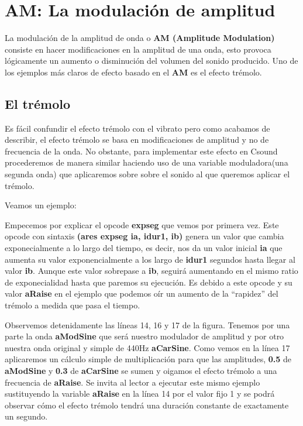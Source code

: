 \section{AM: La modulación de amplitud}

La modulación de la amplitud de onda o \textbf{AM (Amplitude Modulation)} consiste en hacer modificaciones en la amplitud de una onda, esto provoca lógicamente un aumento o disminución del volumen del sonido producido. Uno de los ejemplos más claros de efecto basado en el \textbf{AM} es el efecto trémolo.

\subsection{El trémolo}

Es fácil confundir el efecto trémolo con el vibrato pero como acabamos de describir, el efecto trémolo se basa en modificaciones de amplitud y no de frecuencia de la onda. No obstante, para implementar este efecto en Csound procederemos de manera similar haciendo uso de una variable moduladora(una segunda onda) que aplicaremos sobre sobre el sonido al que queremos aplicar el trémolo. 

Veamos un ejemplo:


Empecemos por explicar el opcode \textbf{expseg} que vemos por primera vez. Este opcode con sintaxis \textbf{(ares expseg ia, idur1, ib)} genera un valor que cambia exponecialmente a lo largo del tiempo, es decir, nos da un valor inicial \textbf{ia} que aumenta su valor exponencialmente a los largo de \textbf{idur1} segundos hasta llegar al valor \textbf{ib}. Aunque este valor sobrepase a \textbf{ib}, seguirá aumentando en el mismo ratio de exponecialidad hasta que paremos su ejecución. Es debido a este opcode y su valor \textbf{aRaise} en el ejemplo que podemos oír un aumento de la ``rapidez'' del trémolo a medida que pasa el tiempo.

Observemos detenidamente las líneas 14, 16 y 17 de la figura. Tenemos por una parte la onda \textbf{aModSine} que será nuestro modulador de amplitud y por otro nuestra onda original y simple de 440Hz \textbf{aCarSine}. Como vemos en la línea 17 aplicaremos un cálculo simple de multiplicación para que las amplitudes, \textbf{0.5} de \textbf{aModSine} y \textbf{0.3} de \textbf{aCarSine} se sumen y oigamos el efecto trémolo a una frecuencia de \textbf{aRaise}. Se invita al lector a ejecutar este mismo ejemplo sustituyendo la variable \textbf{aRaise} en la línea 14 por el valor fijo 1 y se podrá observar cómo el efecto trémolo tendrá una duración constante de exactamente un segundo.

